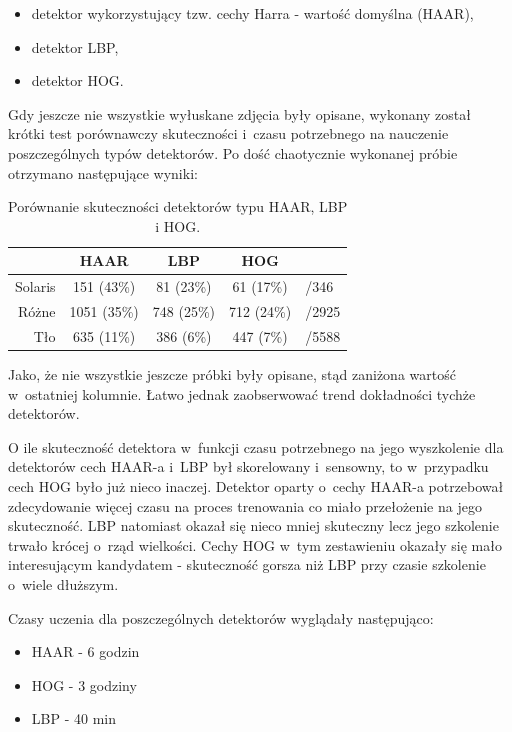 \begin{itemize}
    \item detektor wykorzystujący tzw. cechy Harra - wartość 
        domyślna (HAAR),
    \item detektor LBP,
    \item detektor HOG.
\end{itemize}

Gdy jeszcze nie wszystkie wyłuskane zdjęcia były opisane, wykonany został
krótki test porównawczy skuteczności i~czasu potrzebnego na nauczenie
poszczególnych typów detektorów. Po dość chaotycznie wykonanej próbie
otrzymano następujące wyniki:

\begin{table}[!h]
\centering
\begin{tabular}{r|c|c|c|l}
    & HAAR         & LBP        & HOG              &       \\
    \hline
Solaris & 151  (43\%)  & 81  (23\%) & 61 (17\%)        & /346  \\
Różne   & 1051 (35\%)  & 748 (25\%) & 712 (24\%)       & /2925 \\
Tło     & 635  (11\%)  & 386 (6\%)  & 447 (7\%)        & /5588 \\
\end{tabular}
\caption{Porównanie skuteczności detektorów typu HAAR, LBP i HOG.}
\label{tab:haar_lbp_hog_comparison}
\end{table}

Jako, że nie wszystkie jeszcze próbki były opisane, stąd zaniżona wartość
w~ostatniej kolumnie. Łatwo jednak zaobserwować trend dokładności
tychże detektorów.

O ile skuteczność detektora w~funkcji czasu potrzebnego na jego 
wyszkolenie dla detektorów cech HAAR-a i~LBP był skorelowany i~sensowny,
to w~przypadku cech HOG było już nieco inaczej.
Detektor oparty o~cechy HAAR-a potrzebował
zdecydowanie więcej czasu na proces trenowania co miało przełożenie 
na jego skuteczność. LBP natomiast okazał się nieco mniej skuteczny
lecz jego szkolenie trwało krócej o~rząd wielkości.
Cechy HOG w~tym zestawieniu okazały się mało interesującym kandydatem
- skuteczność gorsza niż LBP przy czasie szkolenie o~wiele dłuższym.

Czasy uczenia dla poszczególnych detektorów wyglądały następująco:
\begin{itemize}
    \item HAAR - 6 godzin
    \item HOG - 3 godziny
    \item LBP - 40 min
\end{itemize}

